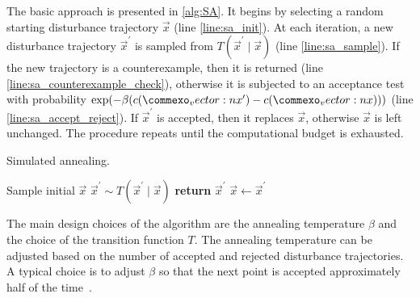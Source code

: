 The basic approach is presented in \cref{alg:SA}. It begins by selecting a random starting disturbance trajectory $\vec{x}$ (line \ref{line:sa_init}). At each iteration, a new disturbance trajectory $\vec{x}^\prime$ is sampled from $T(\vec{x}^\prime \mid \vec{x})$ (line \ref{line:sa_sample}). If the new trajectory is a counterexample, then it is returned (line \ref{line:sa_counterexample_check}), otherwise it is subjected to an acceptance test with probability ${\rm exp}(-\beta(c(\vec{x}^\prime) - c(\vec{x})))$ (line \ref{line:sa_accept_reject}). If $\vec{x}^\prime$ is accepted, then it replaces $\vec{x}$, otherwise $\vec{x}$ is left unchanged. The procedure repeats until the computational budget is exhausted.

\begin{algorithm}
\caption{Simulated annealing.} \label{alg:SA}
\begin{algorithmic}[1]
    \State Sample initial $\vec{x}$ \label{line:sa_init}
    \Loop
        \State $\vec{x}^\prime \sim T(\vec{x}^\prime \mid \vec{x})$ \label{line:sa_sample}
            \State \textbf{return} $\vec{x}^\prime$ \label{line:sa_counterexample_check}
        \EndIf
         \label{line:sa_accept_reject}
            \State $\vec{x} \gets \vec{x}^\prime$
        \EndIf
    \EndLoop
    \EndFunction
\end{algorithmic}
\end{algorithm}


The main design choices of the algorithm are the annealing temperature $\beta$ and the choice of the transition function $T$. The annealing temperature can be adjusted based on the number of accepted and rejected disturbance trajectories. A typical choice is to adjust $\beta$ so that the next point is accepted approximately half of the time~\cite{abbas2013probabilistic}. 

